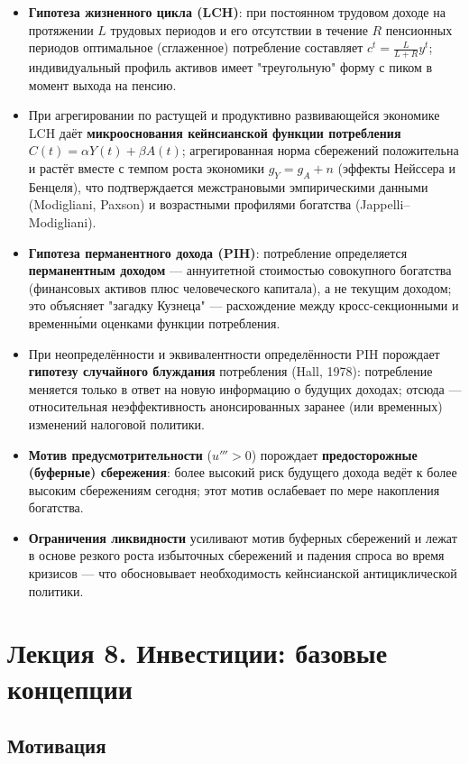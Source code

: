 \documentclass[10pt,a4paper]{article}
\begin{document}
\begin{itemize}[leftmargin=1.3em]
\item \textbf{Гипотеза жизненного цикла (LCH)}: при постоянном трудовом доходе на протяжении $L$ трудовых периодов и его отсутствии в течение $R$ пенсионных периодов оптимальное (сглаженное) потребление составляет $c^t = \frac{L}{L+R}y^t$; индивидуальный профиль активов имеет "треугольную" форму с пиком в момент выхода на пенсию.
\item При агрегировании по растущей и продуктивно развивающейся экономике LCH даёт \textbf{микрооснования кейнсианской функции потребления} $C(t)=\alpha Y(t)+\beta A(t)$; агрегированная норма сбережений положительна и растёт вместе с темпом роста экономики $g_Y=g_A+n$ (эффекты Нейссера и Бенцеля), что подтверждается межстрановыми эмпирическими данными (Modigliani, Paxson) и возрастными профилями богатства (Jappelli--Modigliani).
\item \textbf{Гипотеза перманентного дохода (PIH)}: потребление определяется \textbf{перманентным доходом} — аннуитетной стоимостью совокупного богатства (финансовых активов плюс человеческого капитала), а не текущим доходом; это объясняет "загадку Кузнеца" — расхождение между кросс-секционными и временны́ми оценками функции потребления.
\item При неопределённости и эквивалентности определённости PIH порождает \textbf{гипотезу случайного блуждания} потребления (Hall, 1978): потребление меняется только в ответ на новую информацию о будущих доходах; отсюда — относительная неэффективность анонсированных заранее (или временных) изменений налоговой политики.
\item \textbf{Мотив предусмотрительности} ($u'''>0$) порождает \textbf{предосторожные (буферные) сбережения}: более высокий риск будущего дохода ведёт к более высоким сбережениям сегодня; этот мотив ослабевает по мере накопления богатства.
\item \textbf{Ограничения ликвидности} усиливают мотив буферных сбережений и лежат в основе резкого роста избыточных сбережений и падения спроса во время кризисов — что обосновывает необходимость кейнсианской антициклической политики.
\end{itemize}

\newpage
\section{Лекция 8. Инвестиции: базовые концепции}

\subsection{Мотивация}
\end{document}
